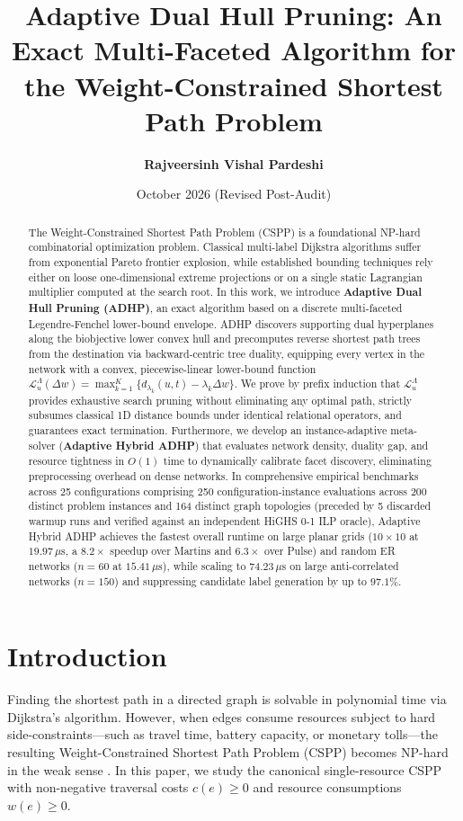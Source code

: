 \documentclass[11pt,a4paper]{article}
\title{\textbf{Adaptive Dual Hull Pruning: An Exact Multi-Faceted Algorithm for the Weight-Constrained Shortest Path Problem}}
\author{\textbf{Rajveersinh Vishal Pardeshi}}
\date{October 2026 (Revised Post-Audit)}
\begin{document}
\maketitle

\begin{abstract}
The Weight-Constrained Shortest Path Problem (CSPP) is a foundational NP-hard combinatorial optimization problem. Classical multi-label Dijkstra algorithms suffer from exponential Pareto frontier explosion, while established bounding techniques rely either on loose one-dimensional extreme projections or on a single static Lagrangian multiplier computed at the search root. In this work, we introduce \textbf{Adaptive Dual Hull Pruning (ADHP)}, an exact algorithm based on a discrete multi-faceted Legendre-Fenchel lower-bound envelope. ADHP discovers supporting dual hyperplanes along the biobjective lower convex hull and precomputes reverse shortest path trees from the destination via backward-centric tree duality, equipping every vertex in the network with a convex, piecewise-linear lower-bound function $\mathcal{L}_u^\Lambda(\Delta w) = \max_{k=1}^K \{ d_{\lambda_k}(u, t) - \lambda_k \Delta w \}$. We prove by prefix induction that $\mathcal{L}_u^\Lambda$ provides exhaustive search pruning without eliminating any optimal path, strictly subsumes classical 1D distance bounds under identical relational operators, and guarantees exact termination. Furthermore, we develop an instance-adaptive meta-solver (\textbf{Adaptive Hybrid ADHP}) that evaluates network density, duality gap, and resource tightness in $O(1)$ time to dynamically calibrate facet discovery, eliminating preprocessing overhead on dense networks. In comprehensive empirical benchmarks across 25 configurations comprising 250 configuration-instance evaluations across 200 distinct problem instances and 164 distinct graph topologies (preceded by 5 discarded warmup runs and verified against an independent HiGHS 0-1 ILP oracle), Adaptive Hybrid ADHP achieves the fastest overall runtime on large planar grids ($10 \times 10$ at $19.97 \, \mu\text{s}$, a $8.2\times$ speedup over Martins and $6.3\times$ over Pulse) and random ER networks ($n=60$ at $15.41 \, \mu\text{s}$), while scaling to $74.23 \, \mu\text{s}$ on large anti-correlated networks ($n=150$) and suppressing candidate label generation by up to $97.1\%$.
\end{abstract}

\section{Introduction}
Finding the shortest path in a directed graph is solvable in polynomial time via Dijkstra's algorithm. However, when edges consume resources subject to hard side-constraints---such as travel time, battery capacity, or monetary tolls---the resulting Weight-Constrained Shortest Path Problem (CSPP) becomes NP-hard in the weak sense \cite{garey1979computers}. In this paper, we study the canonical single-resource CSPP with non-negative traversal costs $c(e) \ge 0$ and resource consumptions $w(e) \ge 0$.
\end{document}
